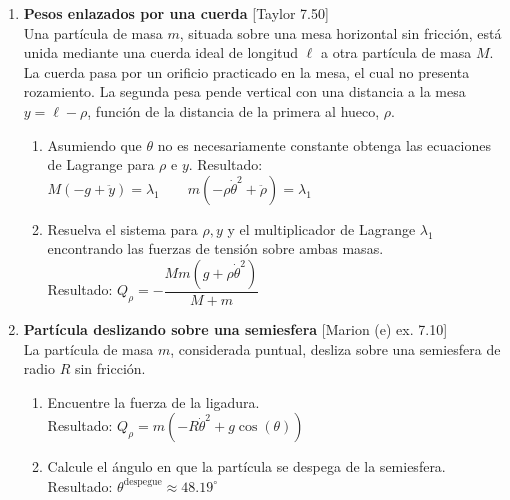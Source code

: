 \documentclass[11pt, spanish, a4paper, twoside]{article}
\begin{document}
\begin{enumerate}
	\item
	\begin{minipage}[t][7.5cm]{0.65\textwidth}
		\textbf{Pesos enlazados por una cuerda} [Taylor 7.50]\\
		Una partícula de masa \(m\), situada sobre una mesa horizontal sin fricción, está unida mediante una cuerda ideal de longitud \(\ell\) a otra partícula de masa \(M\).
		La cuerda pasa por un orificio practicado en la mesa, el cual no presenta rozamiento.
		La segunda pesa pende vertical con una distancia a la mesa \(y = \ell - \rho\), función de la distancia de la primera al hueco, \(\rho\).
		\begin{enumerate}
			\item Asumiendo que \(\theta\) no es necesariamente constante obtenga las ecuaciones de Lagrange para \(\rho\) e  \(y\). Resultado:\\[5 pt]
			\(M \left(- g + \ddot{y}\right) = \lambda_{1} \qquad m \left(- \rho \dot{\theta}^{2} + \ddot{\rho}\right) = \lambda_{1}\)
			\item Resuelva el sistema para \(\rho, y\) y el multiplicador de Lagrange \(\lambda_1\) encontrando las fuerzas de tensión sobre ambas masas.\\[5 pt]
			Resultado: \(Q_{\rho} = - \dfrac{M m \left(g + \rho \dot{\theta}^{2}\right)}{M + m}\)
		\end{enumerate}
	\end{minipage}
	\begin{minipage}[c][-1cm][t]{0.3\textwidth}
		
	\end{minipage}


	\item
	\begin{minipage}[t][4.5cm]{0.62\textwidth}
		\textbf{Partícula deslizando sobre una semiesfera} [Marion (e) ex. 7.10]\\
		La partícula de masa \(m\), considerada puntual, desliza sobre una semiesfera de radio \(R\) sin fricción.
		\begin{enumerate}
			\item Encuentre la fuerza de la ligadura.\\
			Resultado: \(Q_{\rho} = m \left(- R \dot{\theta}^{2} + g \cos{\left(\theta \right)}\right)\)
			\item Calcule el ángulo en que la partícula se despega de la semiesfera.\\
			Resultado: \(\theta^\mathrm{despegue} \approx 48.19^\circ\) 
		\end{enumerate}
	\end{minipage}
	\begin{minipage}[c][0cm][t]{0.3\textwidth}
		
	\end{minipage}
	

\end{enumerate}
\end{document}
